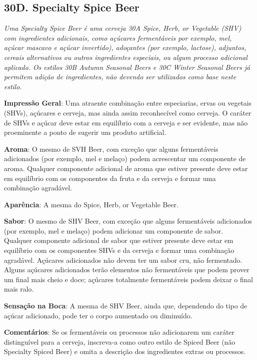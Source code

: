 \subsection*{30D. Specialty Spice Beer}
\textit{Uma Specialty Spice Beer é uma cerveja 30A Spice, Herb, or Vegetable (SHV) com ingredientes adicionais, como açúcares fermentáveis por exemplo, mel, açúcar mascavo e açúcar invertido), adoçantes (por exemplo, lactose), adjuntos, cereais alternativos ou outros ingredientes especiais, ou algum processo adicional aplicado. Os estilos 30B Autumn Seasonal Beers e 30C Winter Seasonal Beers já permitem adição de ingredientes, não devendo ser utilizados como base neste estilo.}

\textbf{Impressão Geral}: Uma atraente combinação entre especiarias, ervas ou vegetais (SHVs), açúcares e cerveja, mas ainda assim reconhecível como cerveja. O caráter de SHVs e açúcar deve estar em equilíbrio com a cerveja e ser evidente, mas não proeminente a ponto de sugerir um produto artificial.

\textbf{Aroma}: O mesmo de SVH Beer, com exceção que alguns fermentáveis adicionados (por exemplo, mel e melaço) podem acrescentar um componente de aroma. Qualquer componente adicional de aroma que estiver presente deve estar em equilíbrio com os componentes da fruta e da cerveja e formar uma combinação agradável.

\textbf{Aparência}: A mesma do Spice, Herb, or Vegetable Beer.

\textbf{Sabor}: O mesmo de SHV Beer, com exceção que alguns fermentáveis adicionados (por exemplo, mel e melaço) podem adicionar um componente de sabor. Qualquer componente adicional de sabor que estiver presente deve estar em equilíbrio com os componentes SHVs e da cerveja e formar uma combinação agradável. Açúcares adicionados não devem ter um sabor cru, não fermentado. Alguns açúcares adicionados terão elementos não fermentáveis que podem prover um final mais cheio e doce; açúcares totalmente fermentáveis podem deixar o final mais ralo.

\textbf{Sensação na Boca}: A mesma de SHV Beer, ainda que, dependendo do tipo de açúcar adicionado, pode ter o corpo aumentado ou diminuído.

\textbf{Comentários}: Se os fermentáveis ou processos não adicionarem um caráter distinguível para a cerveja, inscreva-a como outro estilo de Spiced Beer (não Specialty Spiced Beer) e omita a descrição dos ingredientes extras ou processos.


